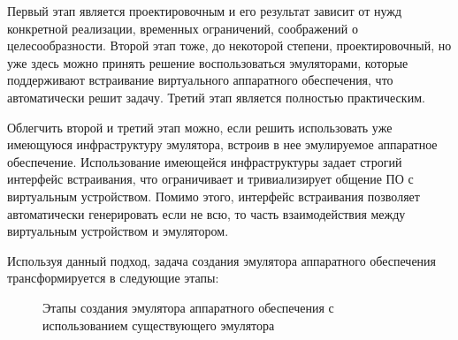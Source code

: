 
Первый этап является проектировочным и его результат зависит от нужд конкретной реализации, временных ограничений,
соображений о целесообразности.
Второй этап тоже, до некоторой степени, проектировочный, но уже здесь можно принять решение
воспользоваться эмуляторами, которые поддерживают встраивание виртуального аппаратного обеспечения,
что автоматически решит задачу.
Третий этап является полностью практическим.

Облегчить второй и третий этап можно, если решить использовать уже имеющуюся инфраструктуру эмулятора,
встроив в нее эмулируемое аппаратное обеспечение.
Использование имеющейся инфраструктуры задает строгий интерфейс встраивания, что ограничивает и тривиализирует
общение ПО с виртуальным устройством.
Помимо этого, интерфейс встраивания позволяет автоматически генерировать если не всю, то часть взаимодействия
между виртуальным устройством и эмулятором.

Используя данный подход, задача создания эмулятора аппаратного обеспечения трансформируется в следующие этапы:
\begin{figure}[!htbp]
    \centering
    \caption{Этапы создания эмулятора аппаратного обеспечения с использованием существующего эмулятора}\label{fig:emu-creation-pro}
\end{figure}


